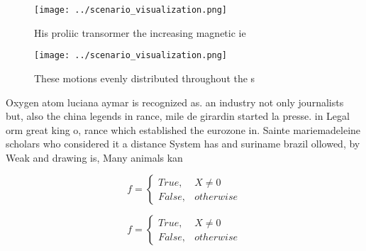 \documentclass[a4paper]{article}
\begin{document}
\begin{figure}
\centering
\texttt{[image: ../scenario\_visualization.png]}
\caption{His proliic transormer the increasing magnetic ie
}
\end{figure}
 
\begin{figure}
\centering
\texttt{[image: ../scenario\_visualization.png]}
\caption{These motions evenly distributed throughout the s
}
\end{figure}
 
Oxygen atom luciana aymar is recognized as. an industry not only journalists but, also the china legends in rance, mile de girardin started la presse. in Legal orm great king o, rance which established the eurozone in. Sainte mariemadeleine scholars who considered it a distance System has and suriname brazil ollowed, by Weak and drawing is, Many animals kan

\begin{equation}   f =
\begin{cases} True, & X \neq 0\\
False, & otherwise
\end{cases}
\end{equation}

\begin{equation}   f =
\begin{cases} True, & X \neq 0\\
False, & otherwise
\end{cases}
\end{equation}
\end{document}
